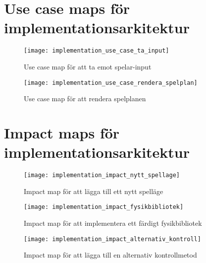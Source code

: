 \section{Use case maps för implementationsarkitektur}
\label{sec:use_case_implementation}

\begin{figure}[h]
    \centering
    \texttt{[image: implementation\_use\_case\_ta\_input]}
    \caption{Use case map för att ta emot spelar-input}
    \label{fig:use_case_implementation_input}
\end{figure}

\begin{figure}[h]
    \centering
    \texttt{[image: implementation\_use\_case\_rendera\_spelplan]}
    \caption{Use case map för att rendera spelplanen}
    \label{fig:use_case_implementation_rendera}
\end{figure}

\pagebreak

\section{Impact maps för implementationsarkitektur}
\label{sec:impact_implementation}

\begin{figure}[h]
    \centering
    \texttt{[image: implementation\_impact\_nytt\_spellage]}
    \caption{Impact map för att lägga till ett nytt spelläge}
    \label{fig:impact_implementation_spellage}
\end{figure}

\begin{figure}[h]
    \centering
    \texttt{[image: implementation\_impact\_fysikbibliotek]}
    \caption{Impact map för att implementera ett färdigt fysikbibliotek}
    \label{fig:impact_implementation_fysikbibliotek}
\end{figure}

\begin{figure}[h]
    \centering
    \texttt{[image: implementation\_impact\_alternativ\_kontroll]}
    \caption{Impact map för att lägga till en alternativ kontrollmetod}
    \label{fig:impact_implementation_alt_kontroll}
\end{figure}
